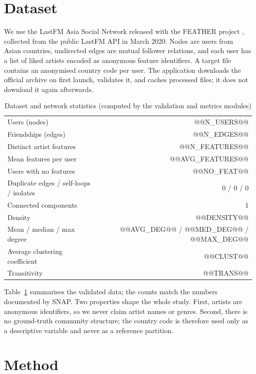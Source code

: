 \documentclass[conference]{IEEEtran}
\begin{document}
\section{Dataset}\label{sec:data}
We use the LastFM Asia Social Network released with the FEATHER project \cite{rozemberczki2020}, collected from the public LastFM API in March 2020. Nodes are users from Asian countries, undirected edges are mutual follower relations, and each user has a list of liked artists encoded as anonymous feature identifiers. A target file contains an anonymised country code per user. The application downloads the official archive on first launch, validates it, and caches processed files; it does not download it again afterwards.

\begin{table}[t]
\caption{Dataset and network statistics (computed by the validation and metrics modules)}
\label{tab:data}
\centering
\begin{tabular}{lr}
\toprule
Users (nodes) & @@N_USERS@@ \\
Friendships (edges) & @@N_EDGES@@ \\
Distinct artist features & @@N_FEATURES@@ \\
Mean features per user & @@AVG_FEATURES@@ \\
Users with no features & @@NO_FEAT@@ \\
Duplicate edges / self-loops / isolates & 0 / 0 / 0 \\
Connected components & 1 \\
Density & @@DENSITY@@ \\
Mean / median / max degree & @@AVG_DEG@@ / @@MED_DEG@@ / @@MAX_DEG@@ \\
Average clustering coefficient & @@CLUST@@ \\
Transitivity & @@TRANS@@ \\
\bottomrule
\end{tabular}
\end{table}

Table~\ref{tab:data} summarises the validated data; the counts match the numbers documented by SNAP. Two properties shape the whole study. First, artists are anonymous identifiers, so we never claim artist names or genres. Second, there is no ground-truth community structure; the country code is therefore used only as a descriptive variable and never as a reference partition.

\section{Method}\label{sec:method}
\end{document}

